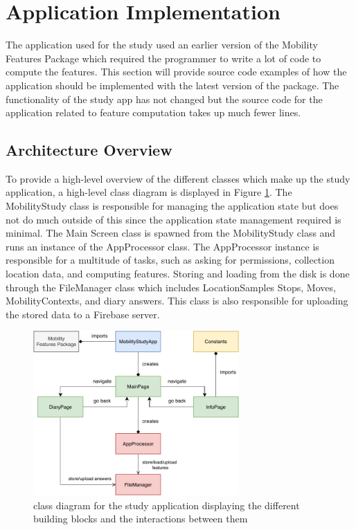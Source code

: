 \section{Application Implementation}
The application used for the study used an earlier version of the Mobility Features Package which required the programmer to write a lot of code to compute the features. This section will provide source code examples of how the application should be implemented with the latest version of the package. The functionality of the study app has not changed but the source code for the application related to feature computation takes up much fewer lines.

\subsection{Architecture Overview}
To provide a high-level overview of the different classes which make up the study application, a high-level class diagram is displayed in Figure \ref{fig:app-class-diagram}. The MobilityStudy class is responsible for managing the application state but does not do much outside of this since the application state management required is minimal. The Main Screen class is spawned from the MobilityStudy class and runs an instance of the AppProcessor class. The AppProcessor instance is responsible for a multitude of tasks, such as asking for permissions, collection location data, and computing features. Storing and loading from the disk is done through the FileManager class which includes LocationSamples Stops, Moves, MobilityContexts, and diary answers. This class is also responsible for uploading the stored data to a Firebase server.

\begin{figure}
    \centering
    \includegraphics[width=0.7\textwidth]{images/diagrams/app-diagram.pdf}
    \caption{class diagram for the study application displaying the different building blocks and the interactions between them}
    \label{fig:app-class-diagram}
\end{figure}

